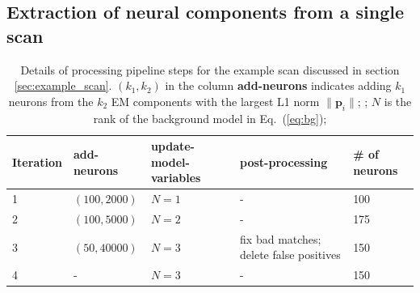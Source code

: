 \documentclass[10pt,letterpaper]{article}
\begin{document}
{%

\subsection{Extraction of neural components from a single scan}
\label{sec:one_scan}

\label{sec:example_scan}

\begin{table}
	\centering 
	\begin{tabular}{lllll}
	\toprule
	\cmidrule{1-2}
	Iteration  & add-neurons &update-model-variables  & post-processing  & \# of neurons \\
	\hline
	\hline 
	1 & $(100, 2000)$ & $ N= 1$ & - & 100\\
	\midrule
	2 & $(100, 5000)$ & $ N= 2$ & - & 175 \\
	\midrule 
	3 & $(50, 40000)$ & $ N= 3$ & fix bad matches; delete false positives& 150\\
	4 & -& $ N= 3$ & - &150 \\

	 \bottomrule
	\end{tabular}
	\caption{Details of processing pipeline steps for the example scan discussed in section \ref{sec:example_scan}. $(k_1, k_2)$ in the column \textbf{add-neurons} indicates adding $k_1$ neurons from the $k_2$ EM components with the largest L1 norm $\|\bm{p}_i\|$; ; $N$ is the rank of the background model in Eq.~(\ref{eq:bg});%
	} 
\label{table:pipeline}	
\end{table}

}
\end{document}
